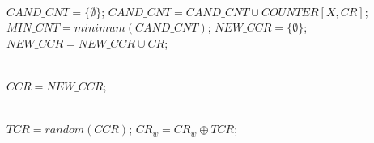\begin{algorithm}[H]
\begin{algorithmic}[1]
\begin{footnotesize}
                                \\
                                \State $ CAND\_CNT = \{ \emptyset \} $;
                                    \State $ CAND\_CNT = CAND\_CNT \cup COUNTER\left[X, CR \right] $;
                                \EndFor
                                \State $ MIN\_CNT = minimum(CAND\_CNT) $;
                                \State $ NEW\_CCR = \{ \emptyset \} $;
                                        \State $ NEW\_CCR = NEW\_CCR \cup CR $;
                                    \EndIf
                                \EndFor
                                
                                \\
                                \State $ CCR = NEW\_CCR $;
                            \EndIf
                        \EndFor
                        
                        \\
                        \State $ TCR = random(CCR) $;
                            \State $ CR_{w} = CR_{w} \oplus TCR $;
                        \EndFor
        \end{footnotesize}
    \end{algorithmic}
\end{algorithm}

